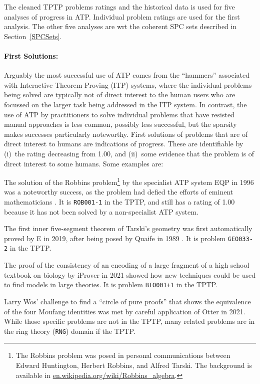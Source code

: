 \documentclass[runningheads]{llncs}
\newenvironment{packed_itemize}{
\vspace*{-0.5em}
\begin{itemize}
\setlength{\partopsep}{0pt}
\setlength{\itemsep}{1pt}
\setlength{\parskip}{0pt}
\setlength{\parsep}{0pt}
}{\end{itemize}}
\begin{document}
The cleaned TPTP problems ratings and the historical data is used for five analyses of progress
in ATP.
Individual problem ratings are used for the first analysis.
The other five analyses are wrt the coherent SPC sets described in Section~\ref{SPCSets}.

\vspace*{-0.5em}
\paragraph{First Solutions:}
Arguably the most successful use of ATP comes from the ``hammers'' \cite{BK+16} associated with 
Interactive Theorem Proving (ITP) systems, where the individual problems being solved are 
typically not of direct interest to the human users who are focussed on the larger task being 
addressed in the ITP system.
In contrast, the use of ATP by practitioners to solve individual problems that have resisted
manual approaches is less common, possibly less successful, but the sparsity makes successes 
particularly noteworthy. 
First solutions of problems that are of direct interest to humans are indications of progress.
These are identifiable by (i)~the rating decreasing from 1.00, and (ii)~some evidence that the 
problem is of direct interest to some humans.
Some examples are:
\begin{packed_itemize}
\item The solution of the Robbins problem\footnote{%
      The Robbins problem was posed in personal communications between Edward Huntington,
      Herbert Robbins, and Alfred Tarski.
      The background is available in 
      \href{https://en.wikipedia.org/wiki/Robbins_algebra}{en.wikipedia.org/wiki/Robbins\_algebra}.}
      by the specialist ATP system EQP \cite{McC97} 
      in 1996 was a noteworthy success, as the problem had defied the efforts of eminent 
      mathematicians \cite{HMT71}.
      It is {\tt ROB001-1} in the TPTP, and still has a rating of 1.00 because it has not
      been solved by a non-specialist ATP system.
\item The first inner five-segment theorem of Tarski's geometry \cite{SST83} was first 
      automatically proved by E \cite{Sch13-LPAR} in 2019, after being posed by Quaife in 
      1989 \cite{Qua89}.
      It is problem {\tt GEO033-2} in the TPTP.
\item The proof of the consistency of an encoding of a large fragment of a high school textbook
      on biology \cite{CDI13} by iProver \cite{Kor08} in 2021 showed how new techniques could
      be used to find models in large theories.
      It is problem {\tt BIO001+1} in the TPTP.
\item Larry Wos' challenge to find a ``circle of pure proofs'' that shows the equivalence
      of the four Moufang identities \cite{Wos19} was met by careful application \cite{Ver22} of
      Otter \cite{McC03-Otter} in 2021.
      While those specific problems are not in the TPTP, many related problems are in the
      ring theory ({\tt RNG}) domain if the TPTP.
\end{packed_itemize}
\end{document}
